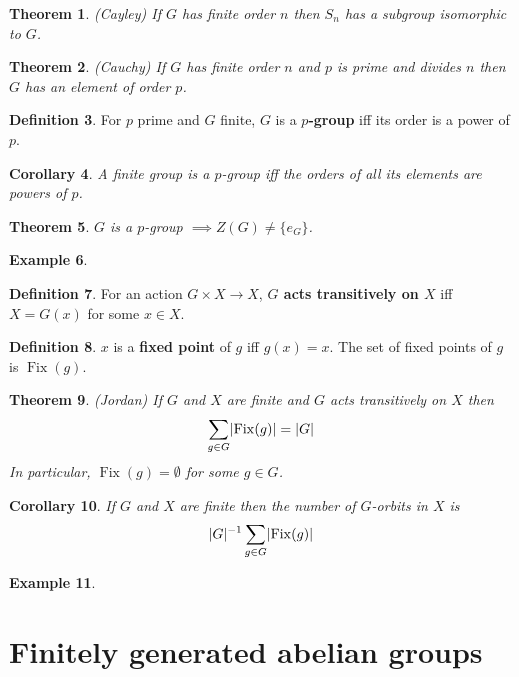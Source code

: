 \documentclass[12pt]{article}
\newtheorem{thm}{Theorem}[section]
\newtheorem{cor}[thm]{Corollary}
\theoremstyle{definition}
\newtheorem{defn}[thm]{Definition}
\newtheorem{exm}[thm]{Example}
\DeclarePairedDelimiter\abs{\lvert}{\rvert}
\DeclareMathOperator{\Fix}{Fix}
\begin{document}
\begin{thm}
  (Cayley)
  If $G$ has finite order $n$ then $S_n$ has a subgroup isomorphic to $G$.
\end{thm}

\begin{thm}
  (Cauchy)
  If $G$ has finite order $n$ and $p$ is prime and divides $n$ then $G$ has an element of order $p$.
\end{thm}

\begin{defn}
  For $p$ prime and $G$ finite, $G$ is a \textbf{$p$-group} iff its order is a power of $p$.
\end{defn}

\begin{cor}
  A finite group is a $p$-group iff the orders of all its elements are powers of $p$.
\end{cor}

\begin{thm}
  $G$ is a $p$-group $\implies Z(G) \neq \{e_G\}$.
\end{thm}

\begin{exm}
\end{exm}

\begin{defn}
  For an action $G \times X \to X$, \textbf{$G$ acts transitively on $X$} iff $X = G(x)$ for some $x \in X$.
\end{defn}

\begin{defn}
  $x$ is a \textbf{fixed point} of $g$ iff $g(x) = x$.
  The set of fixed points of $g$ is $\Fix(g)$.
\end{defn}

\begin{thm}
  (Jordan)
  If $G$ and $X$ are finite and $G$ acts transitively on $X$ then
  $$\sum_{g \in G}\abs{\Fix(g)} = \abs{G}$$
  In particular, $\Fix(g) = \emptyset$ for some $g \in G$.
\end{thm}

\begin{cor}
  If $G$ and $X$ are finite then the number of $G$-orbits in $X$ is
  $$\abs{G}^{-1}\sum_{g \in G}\abs{\Fix(g)}$$
\end{cor}

\begin{exm}
\end{exm}

\section{Finitely generated abelian groups}
\end{document}
